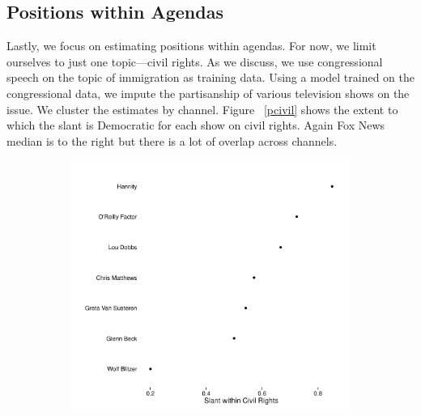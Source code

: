 \documentclass[12pt, letterpaper]{article}
\begin{document}
\subsection*{Positions within Agendas}
Lastly, we focus on estimating positions within agendas. For now, we limit ourselves to just one topic---civil rights. As we discuss, we use congressional speech on the topic of immigration as training data. Using a model trained on the congressional data, we impute the partisanship of various television shows on the issue. We cluster the estimates by channel. Figure ~\ref{pcivil} shows the extent to which the slant is Democratic for each show on civil rights. Again Fox News median is to the right but there is a lot of overlap across channels.

\begin{figure}[H]
  \begin{subfigure}[t]{0.48\textwidth}
   \includegraphics[width=\textwidth]{../figs/civil_prefs.pdf}
    \end{subfigure}
     \hfill
    \begin{subfigure}[t]{0.48\textwidth}

\end{subfigure}
\end{figure}
\end{document}
